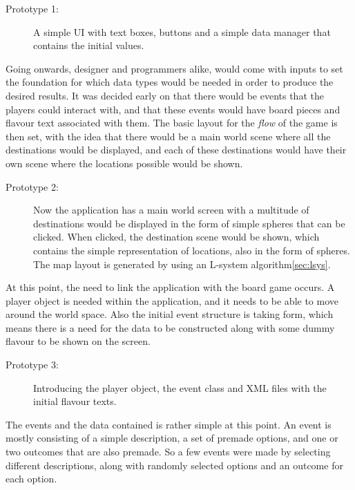 \begin{description}
\item[Prototype 1:] A simple UI with text boxes, buttons and a simple data manager that contains the initial values.
\end{description}

Going onwards, designer and programmers alike, would come with inputs to set the foundation for which data types would be needed in order to produce the desired results.
It was decided early on that there would be events that the players could interact with, and that these events would have board pieces and flavour text associated with them. The basic layout for the \textit{flow} of the game is then set, with the idea that there would be a main world scene where all the destinations would be displayed, and each of these destinations would have their own scene where the locations possible would be shown.

\begin{description}
\item[Prototype 2:] Now the application has a main world screen with a multitude of destinations would be displayed in the form of simple spheres that can be clicked. When clicked, the destination scene would be shown, which contains the simple representation of locations, also in the form of spheres.
The map layout is generated by using an L-system algorithm\ref{sec:lsys}.
\end{description}

At this point, the need to link the application with the board game occurs. A player object is needed within the application, and it needs to be able to move around the world space. Also the initial event structure is taking form, which means there is a need for the data to be constructed along with some dummy flavour to be shown on the screen.

\begin{description}
\item[Prototype 3:] Introducing the player object, the event class and XML files with the initial flavour texts.
\end{description}

The events and the data contained is rather simple at this point. An event is mostly consisting of a simple description, a set of premade options, and one or two outcomes that are also premade. So a few events were made by selecting different descriptions, along with randomly selected options and an outcome for each option.


